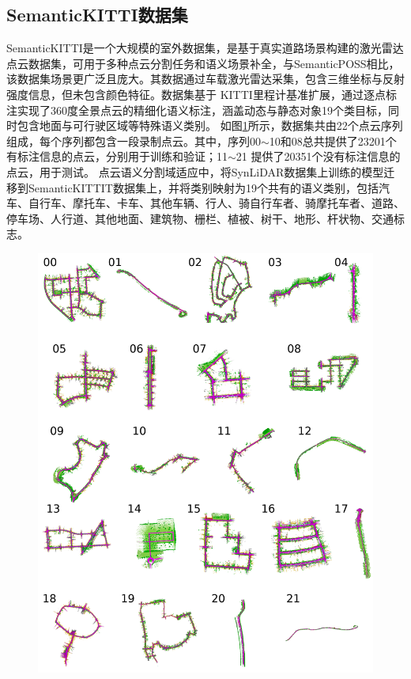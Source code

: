 \subsection{SemanticKITTI数据集}
SemanticKITTI是一个大规模的室外数据集，是基于真实道路场景构建的激光雷达点云数据集，可用于多种点云分割任务和语义场景补全，与SemanticPOSS相比，该数据集场景更广泛且庞大。其数据通过车载激光雷达采集，包含三维坐标与反射强度信息，但未包含颜色特征。数据集基于 KITTI里程计基准扩展，通过逐点标注实现了360度全景点云的精细化语义标注，涵盖动态与静态对象19个类目标，同时包含地面与可行驶区域等特殊语义类别。
如图\ref{fig:2-6}所示，数据集共由22个点云序列组成，每个序列都包含一段录制点云。其中，序列00$\sim$10和08总共提供了23201个有标注信息的点云，分别用于训练和验证；11$\sim$21 提供了20351个没有标注信息的点云，用于测试。
点云语义分割域适应中，将SynLiDAR数据集上训练的模型迁移到SemanticKITTIT数据集上，并将类别映射为19个共有的语义类别，包括汽车、自行车、摩托车、卡车、其他车辆、行人、骑自行车者、骑摩托车者、道路、停车场、人行道、其他地面、建筑物、栅栏、植被、树干、地形、杆状物、交通标志。
\vspace{-0.1cm}
\begin{figure}[H]
    \centering
    \includegraphics[width = \textwidth, scale=0.5]{ljx/figure/2-5/kitti.png}
    \label{fig:2-6}
\end{figure}
\vspace{-0.35cm} 
